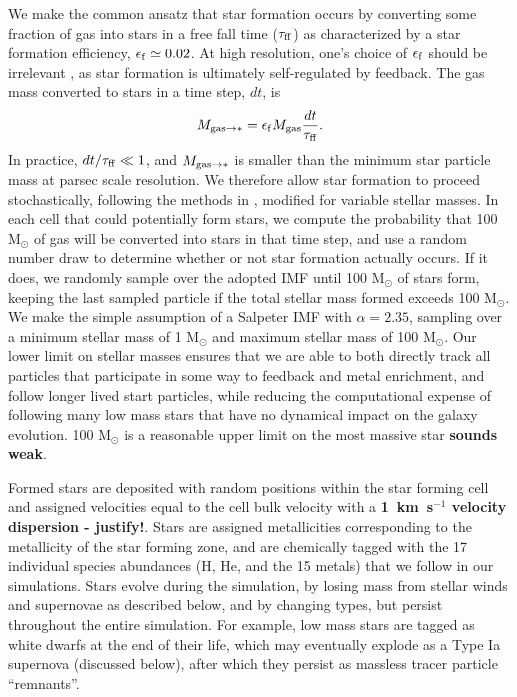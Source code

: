 \documentclass[twocolumn]{aastex61}
\begin{document}
We make the common ansatz that star formation occurs by converting some fraction of gas into stars in a free fall time ($\tau_{\rm ff}$) as characterized by a star formation efficiency, $\epsilon_{\rm f} \simeq 0.02$. At high resolution, one's choice of $\epsilon_{\rm f}$ should be irrelevant \citep{Orr2017, FIRE2}, as star formation is ultimately self-regulated by feedback.
The gas mass converted to stars in a time step, $dt$, is
\begin{equation}
M_{ {\rm gas} \to *} = \epsilon_{\rm f} M_{\rm gas} \frac{dt}{\tau_{\rm ff}}.
\end{equation}
In practice, $dt/\tau_{\rm ff} \ll 1$, and $M_{ {\rm gas} \to *}$ is smaller than the minimum star particle mass at parsec scale resolution. We therefore allow star formation to proceed stochastically, following the methods in \citet{Goldbaum2015, Goldbaum2016}, modified for variable stellar masses. In each cell that could potentially form stars, we compute the probability that 100 M$_{\odot}$ of gas will be converted into stars in that time step, and use a random number draw to determine whether or not star formation actually occurs. If it does, we randomly sample over the adopted IMF until 100 M$_{\odot}$ of stars form, keeping the last sampled particle if the total stellar mass formed exceeds 100 M$_{\odot}$. We make the simple assumption of a Salpeter IMF \citep{Salpeter1955} with $\alpha = 2.35$, sampling over a minimum stellar mass of 1 M$_{\odot}$ and maximum stellar mass of 100 M$_{\odot}$. Our lower limit on stellar masses ensures that we are able to both directly track all particles that participate in some way to feedback and metal enrichment, and follow longer lived start particles, while reducing the computational expense of following many low mass stars that have no dynamical impact on the galaxy evolution. 100 M$_{\odot}$ is a reasonable upper limit on the most massive star \textbf{sounds weak}. 

Formed stars are deposited with random positions within the star forming cell and assigned velocities equal to the cell bulk velocity with a \textbf{1~km~s$^{-1}$ velocity dispersion - justify!}. Stars are assigned metallicities corresponding to the metallicity of the star forming zone, and are chemically tagged with the 17 individual species abundances (H, He, and the 15 metals) that we follow in our simulations. Stars evolve during the simulation, by losing mass from stellar winds and supernovae as described below, and by changing types, but persist throughout the entire simulation. For example, low mass stars are tagged as white dwarfs at the end of their life, which may eventually explode as a Type Ia supernova (discussed below), after which they persist as massless tracer particle ``remnants''. 
\end{document}
